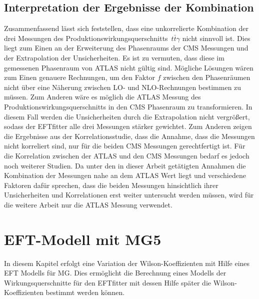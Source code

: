 \section{Interpretation der Ergebnisse der Kombination}
Zusammenfassend lässt sich feststellen, dass eine unkorrelierte Kombination der drei Messungen des Produktionswirkungsquerschnitts~$t\bar{t}\gamma$ nicht sinnvoll ist.
Dies liegt zum Einen an der Erweiterung des Phasenraums der CMS Messungen und der Extrapolation der Unsicherheiten. Es ist zu vermuten, dass diese im gemessenen Phasenraum von ATLAS nicht gültig sind. Mögliche Lösungen wären zum Einen genauere Rechnungen, um den Faktor $f$ zwischen den Phasenräumen nicht über eine Näherung zwischen LO- und NLO-Rechnungen bestimmen zu müssen. Zum Anderen wäre es möglich die ATLAS Messung des Produktionswirkungsquerschnitts in den CMS Phasenraum zu transformieren. In diesem Fall werden die Unsicherheiten durch die Extrapolation nicht vergrößert, sodass der EFTfitter alle drei Messungen stärker gewichtet.
Zum Anderen zeigen die Ergebnisse aus der Korrelationsstudie, dass die Annahme, dass die Messungen nicht korreliert sind, nur für die beiden CMS Messungen gerechtfertigt ist. Für die Korrelation zwischen der ATLAS und den CMS Messungen bedarf es jedoch noch weiterer Studien.
Da unter den in dieser Arbeit getätigten Annahmen die Kombination der Messungen nahe an dem ATLAS Wert liegt und verschiedene Faktoren dafür sprechen, dass die beiden Messungen hinsichtlich ihrer Unsicherheiten und Korrelationen erst weiter untersucht werden müssen, wird für die weitere Arbeit nur die ATLAS Messung verwendet.
%
%
\chapter{EFT-Modell mit MG5}
In diesem Kapitel erfolgt eine Variation der Wilson-Koeffizienten mit Hilfe eines EFT Modells für MG. Dies ermöglicht die Berechnung eines Modells der Wirkungsquerschnitte für den EFTfitter mit dessen Hilfe später die Wilson-Koeffizienten bestimmt werden können.

